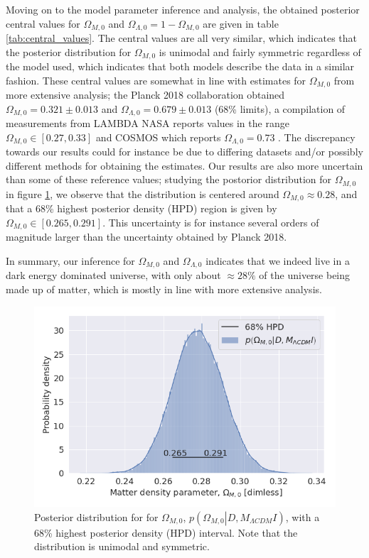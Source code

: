 \documentclass[11pt,a4paper]{article}
\begin{document}
Moving on to the model parameter inference and analysis, the obtained posterior central values for $\Omega_{M,0}$ and $\Omega_{\Lambda,0}=1-\Omega_{M,0}$ are given in table \ref{tab:central_values}. The central values are all very similar, which indicates that the posterior distribution for $\Omega_{M,0}$ is unimodal and fairly symmetric regardless of the model used, which indicates that both models describe the data in a similar fashion. These central values are somewhat in line with estimates for $\Omega_{M,0}$ from more extensive analysis; the Planck 2018 collaboration obtained $\Omega_{M,0} = 0.321 \pm 0.013$ and $\Omega_{\Lambda,0} = 0.679 \pm 0.013$ \cite{planck} (68\% limits), a compilation of measurements from LAMBDA NASA reports values in the range $\Omega_{M,0}\in \left[0.27, 0.33 \right]$ \cite{lambdanasa} and COSMOS which reports $\Omega_{\Lambda,0} = 0.73$ \cite{cosmos}. The discrepancy towards our results could for instance be due to differing datasets and/or possibly different methods for obtaining the estimates. Our results are also more uncertain than some of these reference values; studying the postorior distribution for $\Omega_{M,0}$ in figure \ref{fig:posterior_task2}, we observe that the distribution is centered around $\Omega_{M,0}\approx0.28$, and that a 68\% highest posterior density (HPD) region is given by $\Omega_{M,0} \in [0.265, 0.291]$. This uncertainty is for instance several orders of magnitude larger than the uncertainty obtained by Planck 2018. 

In summary, our inference for $\Omega_{M,0}$ and $\Omega_{\Lambda,0}$ indicates that we indeed live in a dark energy dominated universe, with only about $\approx 28\%$ of the universe being made up of matter, which is mostly in line with more extensive analysis.

\begin{figure}[H]
    \centering
    \includegraphics[width=0.7\linewidth]{figures/omega_m_posterior.png}
    \caption{Posterior distribution for for $\Omega_{M,0}$, $p\left(\Omega_{M,0} \left. \right\vert D, M_{\Lambda CDM} I\right)$, with a 68\% highest posterior density (HPD) interval. Note that the distribution is unimodal and symmetric.}
    \label{fig:posterior_task2}
\end{figure}

\printbibliography
\end{document}
